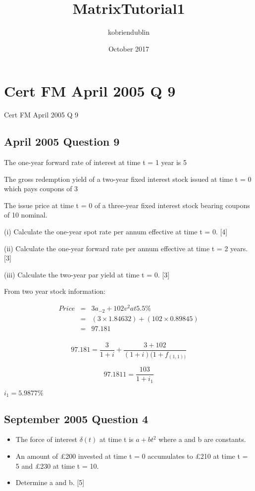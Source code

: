 \documentclass{article}
\title{MatrixTutorial1}
\author{kobriendublin }
\date{October 2017}
\begin{document}
\section{Cert FM  April 2005 Q 9}
Cert FM  April 2005 Q 9


\subsection*{April 2005 Question 9}
The one-year forward rate of interest at time t = 1 year is 5%

The gross redemption yield of a two-year fixed interest stock issued at time t = 0 which pays coupons of 3%

The issue price at time t = 0 of a three-year fixed interest stock bearing coupons of  10%
nominal.

(i) Calculate the one-year spot rate per annum effective at time t = 0. [4]

(ii) Calculate the one-year forward rate per annum effective at time t = 2 years.[3]

(iii) Calculate the two-year par yield at time t = 0. [3]



From two year stock information:

\begin{eqnarray}
Price &=& 3a_{-2} + 102v^2 at 5.5\%\\
&=& (3 \times 1.84632) + (102 \times 0.89845)\\
&=& 97.181\\
\end{eqnarray}


\[97.181 = \frac{3}{1+ i}+ \frac{3 + 102}{(1+ i)(1+f_{(1,1))}}\]

\[97.1811 =\frac{103}{1+i_1}\]

$i_1= 5.9877 \%$
\subsection{September 2005 Question 4}

\begin{itemize}
\item The force of interest $\delta(t)$ at time t is $a +bt^2$ 
where a and b are constants. 
\item 
An amount of £200 invested at time t = 0 accumulates to £210 
at time t = 5 and £230 at time t = 10. 
\item 
Determine a and b. [5]
\end{itemize}
\end{document}
